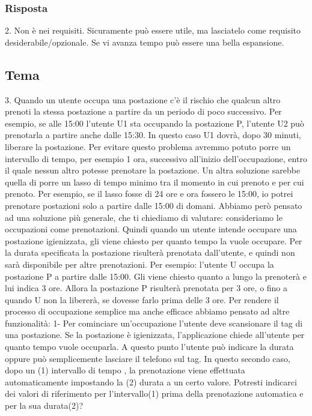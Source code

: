 \subsubsection{Risposta}
2. Non è nei requisiti. Sicuramente può essere utile, ma lasciatelo come requisito desiderabile/opzionale. Se vi avanza tempo può essere una bella espansione.

\subsection*{Tema}
3. Quando un utente occupa una postazione c'è il rischio che qualcun altro prenoti la stessa postazione a partire da un periodo di poco successivo. Per esempio, se alle 15:00 l'utente U1 sta occupando la postazione P, l'utente U2 può prenotarla a partire anche dalle 15:30. In questo caso U1 dovrà, dopo 30 minuti, liberare la postazione.
Per evitare questo problema avremmo potuto porre un intervallo di tempo, per esempio 1 ora, successivo all'inizio dell'occupazione, entro il quale nessun altro potesse prenotare la postazione.
Un altra soluzione sarebbe quella di porre un lasso di tempo minimo tra il momento in cui prenoto e per cui prenoto. Per esempio, se il lasso fosse di 24 ore e ora fossero le 15:00, io potrei prenotare postazioni solo a partire dalle 15:00 di domani.
Abbiamo però pensato ad una soluzione più generale, che ti chiediamo di valutare: consideriamo le occupazioni come prenotazioni.
Quindi quando un utente intende occupare una postazione igienizzata, gli viene chiesto per quanto tempo la vuole occupare. Per la durata specificata la postazione risulterà prenotata dall'utente, e quindi non sarà disponibile per altre prenotazioni. Per esempio: l'utente U occupa la postazione P a partire dalle 15:00. Gli viene chiesto quanto a lungo la prenoterà e lui indica 3 ore. Allora la postazione P risulterà prenotata per 3 ore, o fino a quando U non la libererà, se dovesse farlo prima delle 3 ore.
Per rendere il processo di occupazione semplice ma anche efficace abbiamo pensato ad altre funzionalità:
1- Per cominciare un'occupazione l'utente deve scansionare il tag di una postazione. Se la postazione è igienizzata, l'applicazione chiede all'utente per quanto tempo vuole occuparla. A questo punto l'utente può indicare la durata oppure può semplicemente lasciare il telefono sul tag.
In questo secondo caso, dopo un (1) intervallo di tempo , la prenotazione viene effettuata automaticamente impostando la (2) durata a un certo valore. Potresti indicarci dei valori di riferimento per l'intervallo(1) prima della prenotazione automatica e per la sua durata(2)?
